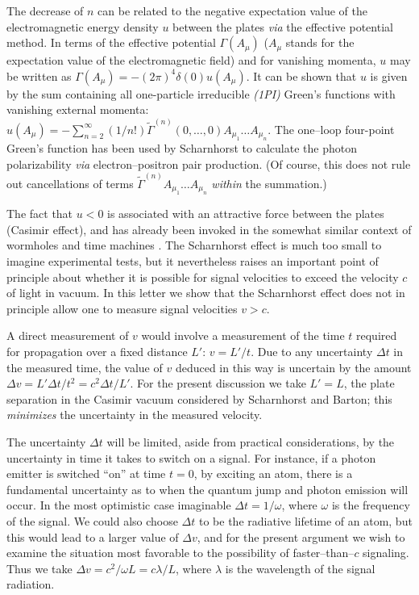 The decrease of $n$ can be related to the negative
expectation value of the electromagnetic energy density $u$ between the
plates {\it via} the effective potential method.
In terms of the effective potential $\Gamma (A_\mu )$
($A_\mu$ stands for the expectation value of the electromagnetic field)
 and for vanishing
 momenta, $u$ may be written as \cite{coleman}
$\Gamma (A_\mu )=-(2\pi)^4\delta (0)u(A_\mu )$. It can be shown that $u$
is given by the
sum containing all one-particle irreducible {\sl (1PI)} Green's
functions with vanishing external momenta:
$u(A_\mu )=-\sum_{n=2}^\infty (1/n!) {\tilde \Gamma }^{(n)} (0,\ldots
,0)A_{\mu_1} \ldots
A_{\mu_n} $. The one--loop four-point Green's function has been used by
Scharnhorst to calculate the photon polarizability {\it via}
electron--positron pair production.
(Of course, this does not rule out cancellations of terms
${\tilde \Gamma}^{(n)}A_{\mu_1}\ldots A_{\mu_n}$ {\sl within} the
summation.)


The fact that $u<0$ is associated with
an attractive force between the plates (Casimir effect), and has already
been invoked in the somewhat similar context of wormholes and time
machines \cite{thorne}. The Scharnhorst effect is much too small to imagine
experimental tests, but it nevertheless raises an important point of principle
about whether it is possible for signal velocities to exceed the velocity $c$ of
light in vacuum. \cite{scharnhorst,barton,barnett} In this letter we show that
 the Scharnhorst
effect does not in principle allow one to measure signal velocities
 $v>c$.

A direct measurement of $v$ would involve a measurement of the time $t$
required for propagation over a fixed distance $L'$:
$v=L'/t$. Due to any uncertainty $\Delta t$ in the measured time, the
value of $v$ deduced in this way is uncertain by the amount $\Delta v=
L'\Delta t/t^2=c^2\Delta t/L'$. For the present discussion we take
$L'=L$, the plate separation in the Casimir vacuum considered by
Scharnhorst and Barton; this {\sl minimizes} the uncertainty in the
measured velocity.
\cite{footnote}

The uncertainty $\Delta t$ will be limited, aside from practical
considerations, by the uncertainty in time it takes to switch on a
signal. For instance, if a photon emitter is switched ``on'' at time
$t=0$, by exciting an atom, there is a fundamental
uncertainty as to when the quantum jump and photon emission will occur.
In the most optimistic case imaginable $\Delta t=1/\omega$, where $\omega$ is
the frequency of the signal. We could also choose $\Delta t$ to be the
radiative lifetime of an atom, but this would lead to a larger value of
$\Delta v$, and for the present argument we wish to examine the
situation most favorable to the possibility of faster--than--$c$
signaling.
Thus we take $\Delta v=c^2/\omega L=c\lambda /L$, where $\lambda$ is the
wavelength of the signal radiation.


